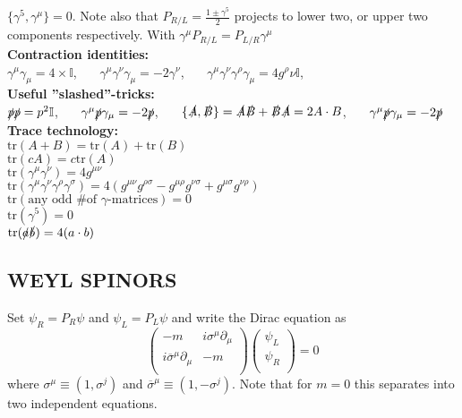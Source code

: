 \documentclass[a4paper, norsk, 8pt, landscape]{article}
\begin{document}
\begin{multicols*}{3}
$\{\gamma^5,\gamma^\mu\}=0$. Note also that $P_{R/L}=\frac{1\pm \gamma^5}{2}$ projects to lower two, or upper two
components respectively. With $\gamma^\mu P_{R/L} = P_{L/R} \gamma^\mu$
\\
 {\textbf{Contraction identities:}} \\
$\gamma^\mu \gamma_\mu = 4 \times \mathbb{I}$, \ \ \
$\gamma^\mu \gamma^\nu \gamma_\mu = -2 \gamma^\nu$, \ \ \
$\gamma^\mu \gamma^\nu \gamma^\rho \gamma_\mu = 4g^\rho \nu \mathbb{I}$, \ \ \
\\
 {\textbf{Useful ''slashed''-tricks:}} \\
$\slashed{p}\slashed{p}=p^2\mathbb{I}$, \ \ \
$\gamma^\mu \slashed{p} \gamma_\mu = -2\slashed{p}$, \ \ \
$\{\slashed{A},\slashed{B}\}=\slashed{A}\slashed{B}+\slashed{B} \slashed{A}=2A \cdot B$, \ \ \
$\gamma^\mu \slashed{p} \gamma_\mu = -2\slashed{p}$
\\
 {\textbf{Trace technology:}} \\
$\text{tr}(A+B)=\text{tr}(A)+\text{tr}(B)$ \\
$\text{tr}(cA)=c\text{tr}(A)$ \\
$\text{tr}(\gamma^\mu \gamma^\nu) = 4g^{\mu\nu}$ \\
$\text{tr}(\gamma^\mu \gamma^\nu \gamma^\rho \gamma^\sigma)
=
4(g^{\mu\nu}g^{\rho\sigma}-g^{\mu\rho}g^{\nu\sigma}+g^{\mu\sigma}g^{\nu\rho})$ \\
$\text{tr}(\text{any odd \# of }\gamma\text{-matrices})=0$ \\
$\text{tr}(\gamma^5)=0$ \\
$\text{tr}(\slashed{a}\slashed{b})=4(a\cdot b)$














\subsection*{\footnotesize  WEYL SPINORS}
Set $\psi_R = P_R \psi$ and $\psi_L= P_L \psi$ and write the Dirac equation as
\[
\left(\begin{matrix}
-m                                  &   i\sigma^\mu \partial_\mu \\
i\overline{\sigma}^\mu \partial_\mu &   -m \\
\end{matrix}\right)
\left(\begin{matrix}
\psi_L \\
\psi_R \\
\end{matrix}\right)=0
\]
where $\sigma^\mu \equiv (1,\sigma^j)$ and $\overline{\sigma}^\mu \equiv (1,-\sigma^j)$. Note that for $m=0$
this separates into two independent equations.














\end{multicols*}
\end{document}
